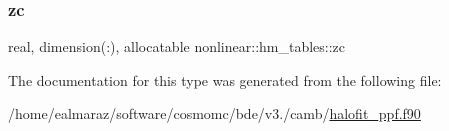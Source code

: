 \mbox{\label{structnonlinear_1_1hm__tables_aedbb7da467cd2bf16769ee32c8b7fa1f}} 
\subsubsection{\texorpdfstring{zc}{zc}}
{\footnotesize\ttfamily real, dimension(\+:), allocatable nonlinear\+::hm\+\_\+tables\+::zc\hspace{0.3cm}{\ttfamily [private]}}



The documentation for this type was generated from the following file\+:\begin{DoxyCompactItemize}
\item 
/home/ealmaraz/software/cosmomc/bde/v3./camb/\mbox{\hyperlink{halofit__ppf_8f90}{halofit\+\_\+ppf.\+f90}}\end{DoxyCompactItemize}

